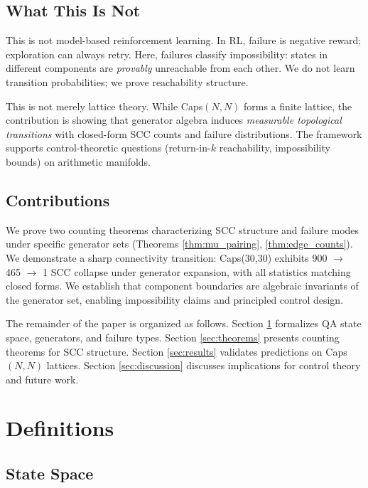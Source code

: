 \documentclass[11pt]{article}
\theoremstyle{definition}
\begin{document}
\subsection{What This Is Not}

This is not model-based reinforcement learning. In RL, failure is negative reward; exploration can always retry. Here, failures classify impossibility: states in different components are \emph{provably} unreachable from each other. We do not learn transition probabilities; we prove reachability structure.

This is not merely lattice theory. While Caps$(N,N)$ forms a finite lattice, the contribution is showing that generator algebra induces \emph{measurable topological transitions} with closed-form SCC counts and failure distributions. The framework supports control-theoretic questions (return-in-$k$ reachability, impossibility bounds) on arithmetic manifolds.

\subsection{Contributions}

We prove two counting theorems characterizing SCC structure and failure modes under specific generator sets (Theorems \ref{thm:mu_pairing}, \ref{thm:edge_counts}). We demonstrate a sharp connectivity transition: Caps(30,30) exhibits 900 $\to$ 465 $\to$ 1 SCC collapse under generator expansion, with all statistics matching closed forms. We establish that component boundaries are algebraic invariants of the generator set, enabling impossibility claims and principled control design.

The remainder of the paper is organized as follows. Section \ref{sec:definitions} formalizes QA state space, generators, and failure types. Section \ref{sec:theorems} presents counting theorems for SCC structure. Section \ref{sec:results} validates predictions on Caps$(N,N)$ lattices. Section \ref{sec:discussion} discusses implications for control theory and future work.

\section{Definitions}
\label{sec:definitions}

\subsection{State Space}
\end{document}
